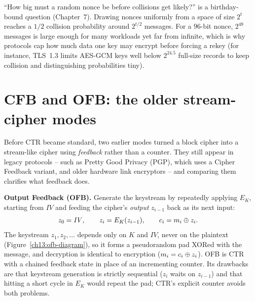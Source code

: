 \begin{connectionbox}
``How big must a random nonce be before collisions get likely?'' is a birthday-bound question (Chapter~7). Drawing nonces uniformly from a space of size $2^t$ reaches a $1/2$ collision probability around $2^{t/2}$ messages. For a $96$-bit nonce, $2^{48}$ messages is large enough for many workloads yet far from infinite, which is why protocols cap how much data one key may encrypt before forcing a rekey (for instance, TLS~1.3 limits AES-GCM keys well below $2^{24.5}$ full-size records to keep collision and distinguishing probabilities tiny).
\end{connectionbox}

\section{CFB and OFB: the older stream-cipher modes}

Before CTR became standard, two earlier modes turned a block cipher into a stream-like cipher using \emph{feedback} rather than a counter. They still appear in legacy protocols -- such as Pretty Good Privacy (PGP), which uses a Cipher Feedback variant, and older hardware link encryptors -- and comparing them clarifies what feedback does.

\textbf{Output Feedback (OFB).} Generate the keystream by repeatedly applying $E_K$, starting from $\mathit{IV}$ and feeding the cipher's \emph{output} $z_{i-1}$ back as its next input:
\[
z_0 = \mathit{IV}, \qquad z_i = E_K(z_{i-1}), \qquad c_i = m_i \oplus z_i.
\]
The keystream $z_1, z_2, \dots$ depends only on $K$ and $\mathit{IV}$, never on the plaintext (Figure~\ref{ch13:ofb-diagram}), so it forms a pseudorandom pad XORed with the message, and decryption is identical to encryption ($m_i = c_i \oplus z_i$). OFB is CTR with a chained feedback state in place of an incrementing counter. Its drawbacks are that keystream generation is strictly sequential ($z_i$ waits on $z_{i-1}$) and that hitting a short cycle in $E_K$ would repeat the pad; CTR's explicit counter avoids both problems.

